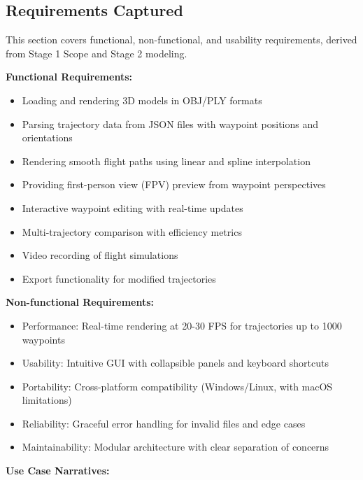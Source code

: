 \documentclass[11pt,a4paper]{article}
\begin{document}
\subsection{Requirements Captured}

This section covers functional, non-functional, and usability requirements, derived from Stage 1 Scope and Stage 2 modeling. 

\textbf{Functional Requirements:}
\begin{itemize}
\item Loading and rendering 3D models in OBJ/PLY formats
\item Parsing trajectory data from JSON files with waypoint positions and orientations
\item Rendering smooth flight paths using linear and spline interpolation
\item Providing first-person view (FPV) preview from waypoint perspectives
\item Interactive waypoint editing with real-time updates
\item Multi-trajectory comparison with efficiency metrics
\item Video recording of flight simulations
\item Export functionality for modified trajectories
\end{itemize}

\textbf{Non-functional Requirements:}
\begin{itemize}
\item Performance: Real-time rendering at 20-30 FPS for trajectories up to 1000 waypoints
\item Usability: Intuitive GUI with collapsible panels and keyboard shortcuts
\item Portability: Cross-platform compatibility (Windows/Linux, with macOS limitations)
\item Reliability: Graceful error handling for invalid files and edge cases
\item Maintainability: Modular architecture with clear separation of concerns
\end{itemize}

\textbf{Use Case Narratives:}

\end{document}
